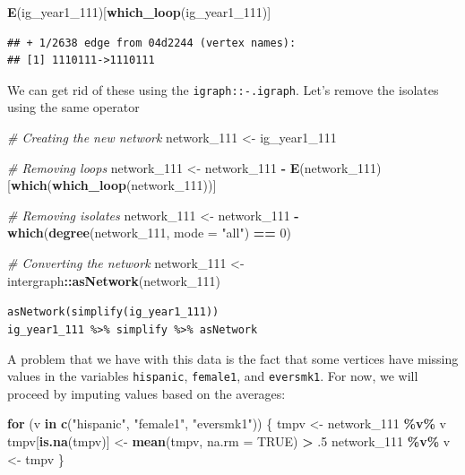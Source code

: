 \documentclass[
]{book}
\newenvironment{Shaded}{\begin{snugshade}}{\end{snugshade}}
\newcommand{\AttributeTok}[1]{\textcolor[rgb]{0.13,0.29,0.53}{#1}}
\newcommand{\CommentTok}[1]{\textcolor[rgb]{0.56,0.35,0.01}{\textit{#1}}}
\newcommand{\ConstantTok}[1]{\textcolor[rgb]{0.56,0.35,0.01}{#1}}
\newcommand{\ControlFlowTok}[1]{\textcolor[rgb]{0.13,0.29,0.53}{\textbf{#1}}}
\newcommand{\DecValTok}[1]{\textcolor[rgb]{0.00,0.00,0.81}{#1}}
\newcommand{\FunctionTok}[1]{\textcolor[rgb]{0.13,0.29,0.53}{\textbf{#1}}}
\newcommand{\NormalTok}[1]{#1}
\newcommand{\OtherTok}[1]{\textcolor[rgb]{0.56,0.35,0.01}{#1}}
\newcommand{\SpecialCharTok}[1]{\textcolor[rgb]{0.81,0.36,0.00}{\textbf{#1}}}
\newcommand{\StringTok}[1]{\textcolor[rgb]{0.31,0.60,0.02}{#1}}
\begin{document}
\begin{Shaded}
\begin{Highlighting}[]
\FunctionTok{E}\NormalTok{(ig\_year1\_111)[}\FunctionTok{which\_loop}\NormalTok{(ig\_year1\_111)]}
\end{Highlighting}
\end{Shaded}

\begin{verbatim}
## + 1/2638 edge from 04d2244 (vertex names):
## [1] 1110111->1110111
\end{verbatim}

We can get rid of these using the \texttt{igraph::-.igraph}. Let's remove the isolates using the same operator

\begin{Shaded}
\begin{Highlighting}[]
\CommentTok{\# Creating the new network}
\NormalTok{network\_111 }\OtherTok{\textless{}{-}}\NormalTok{ ig\_year1\_111}

\CommentTok{\# Removing loops}
\NormalTok{network\_111 }\OtherTok{\textless{}{-}}\NormalTok{ network\_111 }\SpecialCharTok{{-}} \FunctionTok{E}\NormalTok{(network\_111)[}\FunctionTok{which}\NormalTok{(}\FunctionTok{which\_loop}\NormalTok{(network\_111))]}

\CommentTok{\# Removing isolates}
\NormalTok{network\_111 }\OtherTok{\textless{}{-}}\NormalTok{ network\_111 }\SpecialCharTok{{-}} \FunctionTok{which}\NormalTok{(}\FunctionTok{degree}\NormalTok{(network\_111, }\AttributeTok{mode =} \StringTok{"all"}\NormalTok{) }\SpecialCharTok{==} \DecValTok{0}\NormalTok{)}

\CommentTok{\# Converting the network}
\NormalTok{network\_111 }\OtherTok{\textless{}{-}}\NormalTok{ intergraph}\SpecialCharTok{::}\FunctionTok{asNetwork}\NormalTok{(network\_111)}
\end{Highlighting}
\end{Shaded}

\texttt{asNetwork(simplify(ig\_year1\_111))}
\texttt{ig\_year1\_111\ \%\textgreater{}\%\ simplify\ \%\textgreater{}\%\ asNetwork}

A problem that we have with this data is the fact that some vertices have missing values in the variables \texttt{hispanic}, \texttt{female1}, and \texttt{eversmk1}. For now, we will proceed by imputing values based on the averages:

\begin{Shaded}
\begin{Highlighting}[]
\ControlFlowTok{for}\NormalTok{ (v }\ControlFlowTok{in} \FunctionTok{c}\NormalTok{(}\StringTok{"hispanic"}\NormalTok{, }\StringTok{"female1"}\NormalTok{, }\StringTok{"eversmk1"}\NormalTok{)) \{}
\NormalTok{  tmpv }\OtherTok{\textless{}{-}}\NormalTok{ network\_111 }\SpecialCharTok{\%v\%}\NormalTok{ v}
\NormalTok{  tmpv[}\FunctionTok{is.na}\NormalTok{(tmpv)] }\OtherTok{\textless{}{-}} \FunctionTok{mean}\NormalTok{(tmpv, }\AttributeTok{na.rm =} \ConstantTok{TRUE}\NormalTok{) }\SpecialCharTok{\textgreater{}}\NormalTok{ .}\DecValTok{5}
\NormalTok{  network\_111 }\SpecialCharTok{\%v\%}\NormalTok{ v }\OtherTok{\textless{}{-}}\NormalTok{ tmpv}
\NormalTok{\}}
\end{Highlighting}
\end{Shaded}
\end{document}
